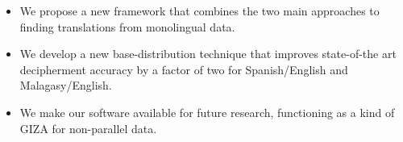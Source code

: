 \begin{itemize}
\item We propose a new framework that combines the two main approaches to finding translations from monolingual data.

\item We develop a new base-distribution technique that improves state-of-the art decipherment accuracy by a factor of two for Spanish/English and Malagasy/English. 

\item We make our software available for future research, functioning as a kind of GIZA for non-parallel data.
\end{itemize}